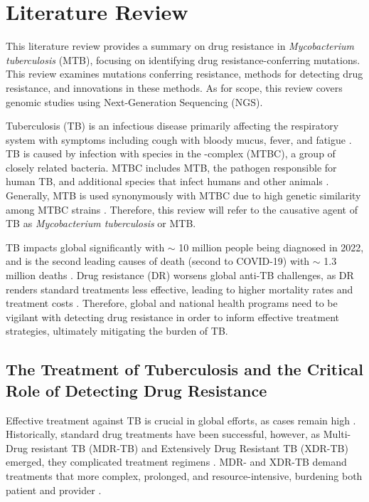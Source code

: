 \section{Literature Review}
This literature review provides a summary on drug resistance in \textit{Mycobacterium tuberculosis} (MTB), focusing on identifying drug resistance-conferring mutations. This review examines mutations conferring resistance, methods for detecting drug resistance, and innovations in these methods. As for scope, this review covers genomic studies using Next-Generation Sequencing (NGS).

Tuberculosis (TB) is an infectious disease primarily affecting the respiratory system  with symptoms including cough with bloody mucus, fever, and fatigue \cite{pai2016}. TB is caused by infection with species in the \mtb-complex (MTBC), a group of closely related bacteria. MTBC includes MTB, the pathogen responsible for human TB, and additional species that infect humans and other animals \cite{gagneux2018}. Generally, MTB is used synonymously with MTBC \cite{riojas2018} due to high genetic similarity among MTBC strains \cite{gagneux2018}. Therefore, this review will refer to the causative agent of TB as \textit{Mycobacterium tuberculosis} or MTB.

TB impacts global significantly with $\sim$ 10 million people being diagnosed in 2022, and is the second leading causes of death (second to COVID-19) with $\sim$ 1.3 million deaths \cite{who2022}. Drug resistance (DR) worsens global anti-TB challenges, as DR renders standard treatments less effective, leading to higher mortality rates and treatment costs \cite{who2022}. Therefore, global and national health programs need to be vigilant with detecting drug resistance in order to inform effective treatment strategies, ultimately mitigating the burden of TB.
\subsection{The Treatment of Tuberculosis and the Critical Role of Detecting Drug Resistance}

Effective treatment against TB is crucial in global efforts, as cases remain high \cite{who2022}. Historically, standard drug treatments have been successful, however, as Multi-Drug resistant TB (MDR-TB) and Extensively Drug Resistant TB (XDR-TB) emerged, they complicated treatment regimens \cite{whitney2016}.  MDR- and XDR-TB demand treatments that more complex, prolonged, and resource-intensive, burdening both patient and provider \cite{whitney2016}. 

